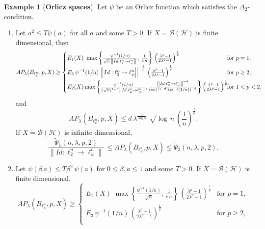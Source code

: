 \documentclass[a4paper,11pt, reqno]{amsart}
\theoremstyle{definition}
\newtheorem{example}{Example}[section]
\newcommand{\norm}[1]{\left\lVert#1\right\rVert}
\begin{document}
	\begin{example} [{\bf Orlicz spaces}]
		Let $\psi$ be an Orlicz function which satisfies the $\Delta_{2}$-condition. 
		\begin{enumerate}
			\item Let $a^2 \leq T \psi(a)$ for all $a$ and some $T>0$.  If $X=\mathcal{B}(\mathcal{H})$ is finite dimensional, then
			\begin{equation*}
				AP_{\lambda}(B_{\ell^n_{\psi}}, p,X) \geq	\begin{cases}
					E_{1}(X)\,  \, \max \left\{\frac{\psi^{-1}(1/n)}{\sqrt{n}\, \norm{Id: \ell^n_{2} \rightarrow \ell^n_{\psi}}}, \, \frac{1}{e\,n}\right\}\, \left(\frac{\lambda^p -1}{2\lambda^p - 1}\right)^{\frac{1}{p}} & \text{for $p=1$}, \\[2mm]
					E_{3}\, \psi^{-1}(1/n)\,\norm{Id:\ell^n _2 \rightarrow \ell^n_{\psi}}^{-\frac{2}{p}}\, \left(\frac{\lambda^p -1}{2\lambda^p - 1}\right)^{\frac{1}{p}}\, & \text{for $p \geq 2$}, \\[2mm]
					
					E_{2}(X)  \max \left\{\frac{\psi^{-1}(1/n)}{(\sqrt{n})^{1-\theta} \norm{Id: \ell^n_{2} \rightarrow \ell^n_{\psi}}},  \frac{\norm{Id:\ell^n _2 \rightarrow \ell^n_{\psi}}^{-\theta}}{(en)^{(1-\theta)} (\psi^{-1}(1/n))^{-\theta}}\right\}\left(\frac{\lambda^p -1}{2\lambda^p - 1}\right)^{\frac{1}{p}} \hspace{-4mm}  & \text{for $1<p< 2$}, 
				\end{cases}
			\end{equation*}
			and $$AP_{\lambda}(B_{\ell^n_{\psi}}, p,X) \leq d\,  \lambda^{\frac{1}{\log\,n}}\,\, \sqrt{\log \, n} \, \left(\frac{1}{n}\right)^{\frac{1}{p}}.
			$$
			If $X=\mathcal{B}(\mathcal{H})$ is infinite dimensional, 
			$$\frac{\tilde{\Psi}_{1}(n,\lambda,p,2)}{\norm{Id:\ell^n _2 \rightarrow \ell^n_{\psi}}} \, \leq AP_{\lambda}(B_{\ell^n_{\psi}}, p,X) \leq  \tilde{\Psi}_{2}(n,\lambda,p,2).
			$$
			
			\item Let $\psi(\beta \,a) \leq T \beta^2\,\psi(a)$ for $0 \leq \beta,a \leq 1$ and some $T>0$. If $X=\mathcal{B}(\mathcal{H})$ is finite dimensional,
			\begin{equation*}
				AP_{\lambda}(B_{\ell^n_{\psi}}, p,X) \geq	\begin{cases}
					E_{1}(X)\,  \, \max \left\{\frac{\psi^{-1}(1/n)}{\sqrt{n}}, \, \frac{1}{e\,n}\right\}\, \left(\frac{\lambda^p -1}{2\lambda^p - 1}\right)^{\frac{1}{p}} & \text{for $p=1$}, \\[2mm]
					E_{3}\,\psi^{-1}(1/n)\, \left(\frac{\lambda^p -1}{2\lambda^p - 1}\right)^{\frac{1}{p}}\, & \text{for $p \geq 2$}, \\[2mm]
					

\end{cases}
\end{equation*}
\end{enumerate}
\end{example}
\end{document}
